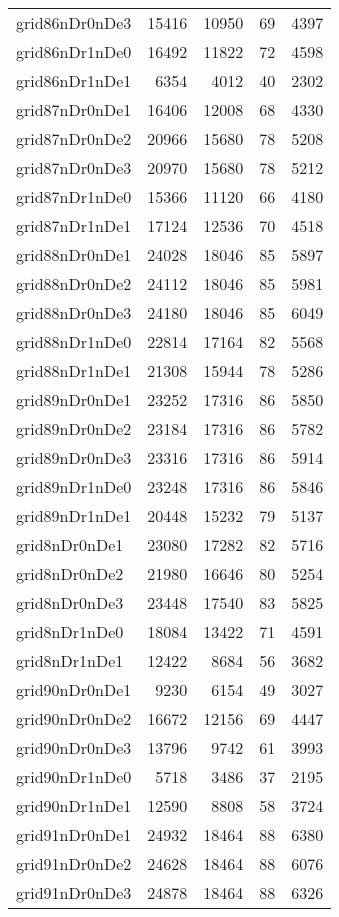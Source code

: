 \begin{tabular}{lrrrr}
grid86nDr0nDe3 & 15416 & 10950 & 69 & 4397 \\
grid86nDr1nDe0 & 16492 & 11822 & 72 & 4598 \\
grid86nDr1nDe1 & 6354 & 4012 & 40 & 2302 \\
grid87nDr0nDe1 & 16406 & 12008 & 68 & 4330 \\
grid87nDr0nDe2 & 20966 & 15680 & 78 & 5208 \\
grid87nDr0nDe3 & 20970 & 15680 & 78 & 5212 \\
grid87nDr1nDe0 & 15366 & 11120 & 66 & 4180 \\
grid87nDr1nDe1 & 17124 & 12536 & 70 & 4518 \\
grid88nDr0nDe1 & 24028 & 18046 & 85 & 5897 \\
grid88nDr0nDe2 & 24112 & 18046 & 85 & 5981 \\
grid88nDr0nDe3 & 24180 & 18046 & 85 & 6049 \\
grid88nDr1nDe0 & 22814 & 17164 & 82 & 5568 \\
grid88nDr1nDe1 & 21308 & 15944 & 78 & 5286 \\
grid89nDr0nDe1 & 23252 & 17316 & 86 & 5850 \\
grid89nDr0nDe2 & 23184 & 17316 & 86 & 5782 \\
grid89nDr0nDe3 & 23316 & 17316 & 86 & 5914 \\
grid89nDr1nDe0 & 23248 & 17316 & 86 & 5846 \\
grid89nDr1nDe1 & 20448 & 15232 & 79 & 5137 \\
grid8nDr0nDe1 & 23080 & 17282 & 82 & 5716 \\
grid8nDr0nDe2 & 21980 & 16646 & 80 & 5254 \\
grid8nDr0nDe3 & 23448 & 17540 & 83 & 5825 \\
grid8nDr1nDe0 & 18084 & 13422 & 71 & 4591 \\
grid8nDr1nDe1 & 12422 & 8684 & 56 & 3682 \\
grid90nDr0nDe1 & 9230 & 6154 & 49 & 3027 \\
grid90nDr0nDe2 & 16672 & 12156 & 69 & 4447 \\
grid90nDr0nDe3 & 13796 & 9742 & 61 & 3993 \\
grid90nDr1nDe0 & 5718 & 3486 & 37 & 2195 \\
grid90nDr1nDe1 & 12590 & 8808 & 58 & 3724 \\
grid91nDr0nDe1 & 24932 & 18464 & 88 & 6380 \\
grid91nDr0nDe2 & 24628 & 18464 & 88 & 6076 \\
grid91nDr0nDe3 & 24878 & 18464 & 88 & 6326 \\

\end{tabular}

